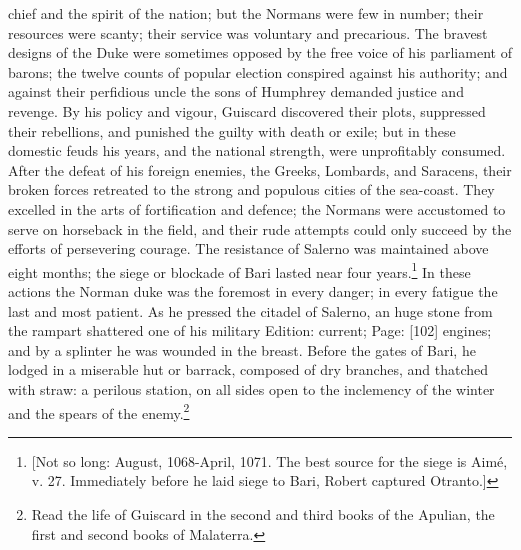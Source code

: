chief and the spirit of the nation; but the Normans were few in number; their resources were scanty; their service was voluntary and precarious. The bravest designs of the Duke were sometimes opposed by the free voice of his parliament of barons; the twelve counts of popular election conspired against his authority; and against their perfidious uncle the sons of Humphrey demanded justice and revenge. By his policy and vigour, Guiscard discovered their plots, suppressed their rebellions, and punished the guilty with death or exile; but in these domestic feuds his years, and the national strength, were unprofitably consumed. After the defeat of his foreign enemies, the Greeks, Lombards, and Saracens, their broken forces retreated to the strong and populous cities of the sea-coast. They excelled in the arts of fortification and defence; the Normans were accustomed to serve on horseback in the field, and their rude attempts could only succeed by the efforts of persevering courage. The resistance of Salerno was maintained above eight months; the siege or blockade of Bari lasted near four years.\footnote{[Not so long: August, 1068-April, 1071. The best source for the siege is Aimé, v. 27. Immediately before he laid siege to Bari, Robert captured Otranto.]} In these actions the Norman duke was the foremost in every danger; in every fatigue the last and most patient. As he pressed the citadel of Salerno, an huge stone from the rampart shattered one of his military Edition: current; Page: [102] engines; and by a splinter he was wounded in the breast. Before the gates of Bari, he lodged in a miserable hut or barrack, composed of dry branches, and thatched with straw: a perilous station, on all sides open to the inclemency of the winter and the spears of the enemy.\footnote{Read the life of Guiscard in the second and third books of the Apulian, the first and second books of Malaterra.}

